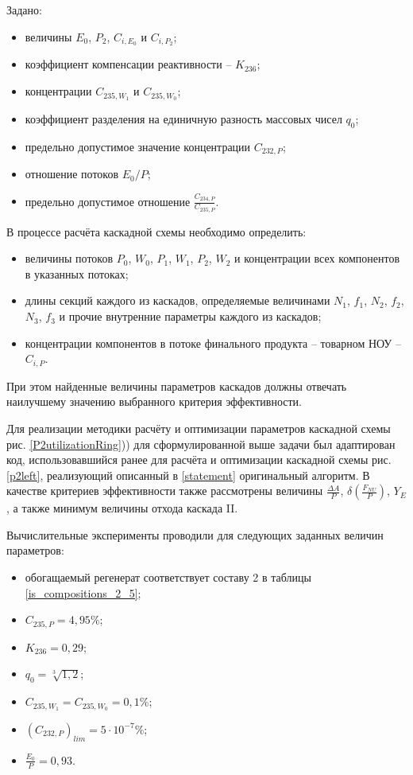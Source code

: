 {Задано:

\begin{itemize}
    \item величины $E_0$, $P_2$, $C_{i,{E_0}}$ и $C_{i,{P_2}}$; 
    \item коэффициент компенсации реактивности -- $K_{236}$;
    \item концентрации $C_{235,{W_1}}$ и $C_{235,{W_0}}$;
    \item коэффициент разделения на единичную разность массовых чисел $q_{0}$;
    \item предельно допустимое значение концентрации $C_{232,{P}}$;
    \item отношение потоков ${E_0}/P$;
    \item предельно допустимое отношение $\frac{C_{234,{P}}}{C_{235,{P}}}$. 
\end{itemize}

В процессе расчёта каскадной схемы необходимо определить:

\begin{itemize}
    \item величины потоков $P_0$, $W_0$, $P_1$, $W_1$, $P_2$, $W_2$ и концентрации всех компонентов в указанных потоках; 
    \item длины секций каждого из каскадов, определяемые величинами $N_1$, $f_1$, $N_2$, $f_2$, $N_3$, $f_3$ и прочие внутренние параметры каждого из каскадов;
    \item концентрации компонентов в потоке финального продукта -- товарном НОУ -- $C_{i,P}$.
\end{itemize}

При этом найденные величины параметров каскадов должны отвечать наилучшему значению выбранного критерия эффективности.  

Для реализации методики расчёту и оптимизации параметров каскадной схемы рис. \ref{P2utilizationRing})) для сформулированной выше задачи был адаптирован код, использовавшийся ранее для расчёта и оптимизации каскадной схемы рис. \ref{p2left}, реализующий описанный в \ref{statement} оригинальный алгоритм. В качестве критериев эффективности также рассмотрены величины $\frac{\Delta A}{P}$, $\delta(\frac{F_{NU}}{P})$, $Y_E$, а также минимум величины отхода каскада II.    

Вычислительные эксперименты проводили для следующих заданных величин параметров: 

\begin{itemize}
    \item обогащаемый регенерат соответствует составу 2 в таблицы \ref{is_compositions_2_5};
    \item $C_{235,{P}}=4,95\%$;
    \item $K_{236}=0,29$;
    \item $q_{0} = \sqrt[3]{1,2}$;
    \item $C_{235,{W_1}}=C_{235,{W_0}}=0,1\%$;
    \item ${(C_{232,P})}_{lim}=5\cdot10^{-7}\%$;
    \item $\frac{E_0}{P}=0,93$.
\end{itemize}

}
